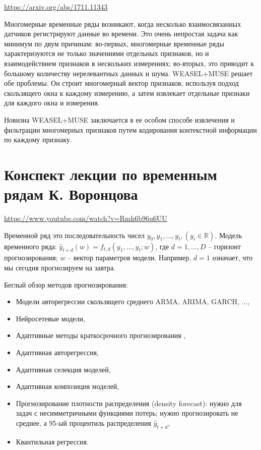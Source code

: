 \documentclass[%
	11pt,
	a4paper,
	utf8,
		]{article}
\begin{document}
\url{https://arxiv.org/abs/1711.11343}

Многомерные временные ряды возникают, когда несколько взаимосвязанных датчиков регистрируют данные во времени. Это очень непростая задача как минимум по двум причинам: во-первых, многомерные временные ряды характеризуются не только значениями отдельных признаков, но и взаимодействием признаков в нескольких измерениях; во-вторых, это приводит к большому количеству нерелевантных данных и шума. WEASEL+MUSE решает обе проблемы. Он строит многомерный вектор признаков, используя подход скользящего окна к каждому измерению, а затем извлекает отдельные признаки для каждого окна и измерения.

Новизна WEASEL+MUSE заключается в ее особом способе извлечения и фильтрации многомерных признаков путем кодирования контекстной информации по каждому признаку.






\section{Конспект лекции по временным рядам К. Воронцова}

\url{https://www.youtube.com/watch?v=Rmh6b96u6UU}

Временной ряд это последовательность чисел $ y_0, y_1, \ldots, y_t, (y_i \in \mathbb{R}) $. Модель временного ряда: $ \hat{y}_{t + d}(w) = f_{t, d}(y_1, \ldots, y_t; w) $, где $ d = 1, \ldots, D $ -- горизонт прогнозирования; $ w $ -- вектор параметров модели. Например, $ d = 1 $ означает, что мы сегодня прогнозируем на завтра.

Беглый обзор методов прогнозирования:
\begin{itemize}
	\item Модели авторегрессии скользящего среднего ARMA, ARIMA, GARCH, ...,
	
	\item Нейросетевые модели,
	
	\item Адаптивные методы краткосрочного прогнозирования \cite{lukashin:adap-time-series-2003},
	
	\item Адаптивная авторегрессия,
	
	\item Адаптивная селекция моделей,
	
	\item Адаптивная композиция моделей,
	
	\item Прогнозирование плотности распределения (density forecast): нужно для задач с несимметричными функциями потерь; нужно прогнозировать не среднее, а 95-ый процентиль распределения $ \hat{y}_{t + d} $,
	
	\item Квантильная регрессия.
\end{itemize}
\end{document}
